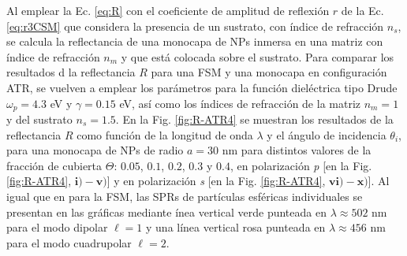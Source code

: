 \documentclass[letterpaper,11pt] {article}
\begin{document}
Al emplear la Ec.  \eqref{eq:R} con el coeficiente de amplitud de reflexión $r$ de la Ec.  \eqref{eq:r3CSM} que considera la presencia de un sustrato, con índice de refracción $n_s$,  se calcula la reflectancia de una monocapa de NPs inmersa en una matriz con índice de refracción $n_m$ y que está colocada sobre el sustrato. Para comparar los resultados d la reflectancia $R$ para una FSM y una monocapa en configuración ATR, se vuelven a emplear los parámetros para la función dieléctrica tipo Drude $\omega_p = 4.3$ eV y $\gamma = 0.15$ eV, así como los índices de refracción de la matriz $n_m = 1$ y del sustrato $n_s = 1.5$. En la Fig.  \ref{fig:R-ATR4} se muestran los resultados de la reflectancia $R$ como función de la longitud de onda $\lambda$ y el ángulo de incidencia $\theta_i$, para una monocapa de NPs de radio $a=30$ nm para distintos valores de la fracción de cubierta $\Theta$: $0. 05$, $0. 1$, $0. 2$, $0. 3$ y $0. 4$, en polarización \emph{p} [en la Fig.  \ref{fig:R-ATR4}, $\mathbf{i)-v)}$] y en polarización \emph{s} [en la Fig.  \ref{fig:R-ATR4}, $\mathbf{vi)-x)}$]. Al igual que en para la FSM, las SPRs de partículas esféricas individuales se presentan en las gráficas mediante ínea vertical verde punteada en $\lambda \approx 502$ nm para el modo dipolar $\ell=1$ y una   línea vertical rosa punteada en  $\lambda \approx 456$ nm para el modo cuadrupolar $\ell=2$. 
\end{document}
